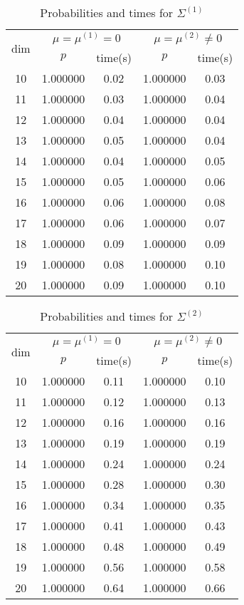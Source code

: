 \begin{table}[htbp]
\begin{center}
\begin{tabular}{c|cccc}
\hline
\multirow{2}{*}{dim}&
\multicolumn{2}{c}{$\mu=\mu^{(1)}=0$}&
\multicolumn{2}{c}{$\mu=\mu^{(2)}\neq 0$}\\
& $p$ & time(s) & $p$ & time(s)  \\
\hline
10 & 1.000000 & 0.02 & 1.000000 & 0.03 \\ 
11 & 1.000000 & 0.03 & 1.000000 & 0.04 \\ 
12 & 1.000000 & 0.04 & 1.000000 & 0.04 \\ 
13 & 1.000000 & 0.05 & 1.000000 & 0.04 \\ 
14 & 1.000000 & 0.04 & 1.000000 & 0.05 \\ 
15 & 1.000000 & 0.05 & 1.000000 & 0.06 \\ 
16 & 1.000000 & 0.06 & 1.000000 & 0.08 \\ 
17 & 1.000000 & 0.06 & 1.000000 & 0.07 \\ 
18 & 1.000000 & 0.09 & 1.000000 & 0.09 \\ 
19 & 1.000000 & 0.08 & 1.000000 & 0.10 \\ 
20 & 1.000000 & 0.09 & 1.000000 & 0.10 \\ 
\hline
\end{tabular}
\end{center}
\caption{Probabilities  and times for $\Sigma^{(1)}$}
\label{tab:hirotsu-1}
\end{table}

\begin{table}[htbp]
\begin{center}
\begin{tabular}{c|cccc}
\hline
\multirow{2}{*}{dim}&
\multicolumn{2}{c}{$\mu=\mu^{(1)}=0$}&
\multicolumn{2}{c}{$\mu=\mu^{(2)}\neq 0$}\\
& $p$ & time(s) & $p$ & time(s)  \\
\hline
10 & 1.000000 & 0.11 & 1.000000 & 0.10 \\ 
11 & 1.000000 & 0.12 & 1.000000 & 0.13 \\ 
12 & 1.000000 & 0.16 & 1.000000 & 0.16 \\ 
13 & 1.000000 & 0.19 & 1.000000 & 0.19 \\ 
14 & 1.000000 & 0.24 & 1.000000 & 0.24 \\ 
15 & 1.000000 & 0.28 & 1.000000 & 0.30 \\ 
16 & 1.000000 & 0.34 & 1.000000 & 0.35 \\ 
17 & 1.000000 & 0.41 & 1.000000 & 0.43 \\ 
18 & 1.000000 & 0.48 & 1.000000 & 0.49 \\ 
19 & 1.000000 & 0.56 & 1.000000 & 0.58 \\ 
20 & 1.000000 & 0.64 & 1.000000 & 0.66 \\ 
\hline
\end{tabular}
\end{center}
\caption{Probabilities  and times for $\Sigma^{(2)}$}
\label{tab:hirotsu-2}
\end{table}

